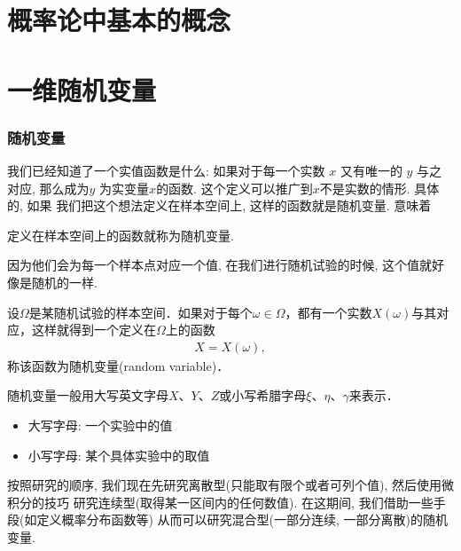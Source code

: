 
\usepackage{ctex}



% 

\part{概率论中基本的概念}





\part{一维随机变量}
\section{随机变量}

我们已经知道了一个实值函数是什么: 如果对于每一个实数 $x$ 又有唯一的 $y$ 与之对应, 
那么成为$y$ 为实变量$x$的函数. 这个定义可以推广到$x$不是实数的情形. 具体的, 如果
我们把这个想法定义在样本空间上, 这样的函数就是随机变量. 意味着

\begin{definition*}
    定义在样本空间上的函数就称为随机变量.
\end{definition*}

因为他们会为每一个样本点对应一个值, 在我们进行随机试验的时候, 这个值就好像是随机的一样. 

\begin{definition}[随机变量]
    设$\Omega$是某随机试验的样本空间．如果对于每个$\omega\in\Omega$，都有一个实数$X(\omega)$与其对应，这样就得到一个定义在$\Omega$上的函数
    \begin{align*}
    X=X(\omega),
    \end{align*}
    称该函数为随机变量(random variable)．
\end{definition}
随机变量一般用大写英文字母$X$、$Y$、$Z$或小写希腊字母$\xi$、$\eta$、$\gamma$来表示．
\begin{itemize}
    \item 大写字母: 一个实验中的值
    \item 小写字母: 某个具体实验中的取值
\end{itemize}

按照研究的顺序, 我们现在先研究离散型(只能取有限个或者可列个值), 然后使用微积分的技巧
研究连续型(取得某一区间内的任何数值). 在这期间, 我们借助一些手段(如定义概率分布函数等)
从而可以研究混合型(一部分连续, 一部分离散)的随机变量. 

